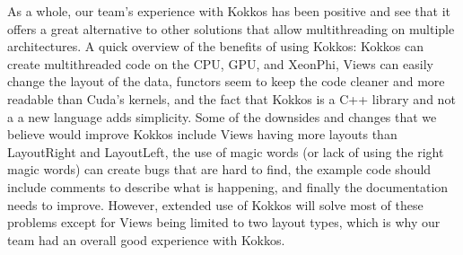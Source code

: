As a whole, our team's experience with Kokkos has been positive and see that it offers a great alternative to other solutions that allow multithreading on multiple architectures. A quick overview of the benefits of using Kokkos: Kokkos can create multithreaded code on the CPU, GPU, and XeonPhi, Views can easily change the layout of the data, functors seem to keep the code cleaner and more readable than Cuda's kernels, and the fact that Kokkos is a C++ library and not a a new language adds simplicity. Some of the downsides and changes that we believe would improve Kokkos include Views having more layouts than LayoutRight and LayoutLeft, the use of magic words (or lack of using the right magic words) can create bugs that are hard to find, the example code should include comments to describe what is happening, and finally the documentation needs to improve. However, extended use of Kokkos will solve most of these problems except for Views being limited to two layout types, which is why our team had an overall good experience with Kokkos.




